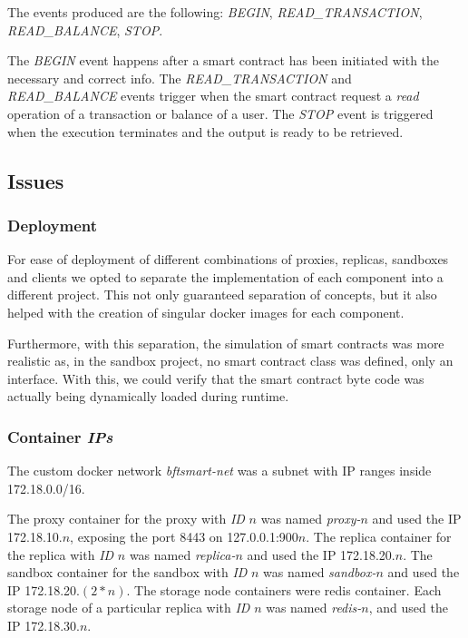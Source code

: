 \documentclass[10pt,journal,compsoc]{IEEEtran}
\begin{document}
    The events produced are the following: \textit{BEGIN}, \textit{READ\_TRANSACTION}, \textit{READ\_BALANCE}, \textit{STOP}. 
    
    The \textit{BEGIN} event happens after a smart contract has been initiated with the necessary and correct info. The \textit{READ\_TRANSACTION} and \textit{READ\_BALANCE} events trigger when the smart contract request a \textit{read} operation of a transaction or balance of a user. The \textit{STOP} event is triggered when the execution terminates and the output is ready to be retrieved.
	
	
	\subsection{Issues}
	\subsubsection{Deployment}
	For ease of deployment of different combinations of proxies, replicas, sandboxes and clients we opted to separate the implementation of each component into a different project. This not only guaranteed separation of concepts, but it also helped with the creation of singular docker images for each component. 
	
	Furthermore, with this separation, the simulation of smart contracts was more realistic as, in the sandbox project, no smart contract class was defined, only an interface. With this, we could verify that the smart contract byte code was actually being dynamically loaded during runtime.
	
	\subsubsection{Container \textit{IPs}}
	The custom docker network \textit{bftsmart-net} was a subnet with IP ranges inside 172.18.0.0/16.
	
    The proxy container for the proxy with \textit{ID} $n$ was named \textit{proxy-$n$} and used the IP 172.18.10.$n$, exposing the port 8443 on 127.0.0.1:900$n$.
    The replica container for the replica with \textit{ID} $n$ was named \textit{replica-$n$} and used the IP 172.18.20.$n$.
    The sandbox container for the sandbox with \textit{ID} $n$ was named \textit{sandbox-$n$} and used the IP 172.18.20.$(2*n)$.
    The storage node containers were redis container. Each storage node of a particular replica with \textit{ID} $n$ was named \textit{redis-$n$}, and used the IP 172.18.30.$n$. 
	
\end{document}
